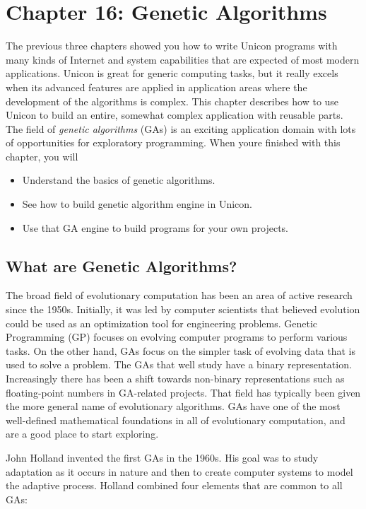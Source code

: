 \clearpage\section{Chapter 16: Genetic Algorithms}

The previous three chapters showed you how to write Unicon programs with
many kinds of Internet and system capabilities that are expected of
most modern applications. Unicon is great for generic computing tasks,
but it really excels when its advanced features are applied in
application areas where the development of the algorithms is complex.
This chapter describes how to use Unicon to build an entire, somewhat
complex application with reusable parts. The field of \textit{genetic algorithms} (GAs) is an exciting application
domain with lots of opportunities for exploratory programming. When
you{\textquotesingle}re finished with this chapter, you will 

\begin{itemize}
\item Understand the basics of genetic algorithms.
\item See how to build genetic algorithm engine in Unicon.
\item Use that GA engine to build programs for your own projects.
\end{itemize}

\subsection{What are Genetic Algorithms?}

The broad field of evolutionary computation has been an area of active
research since the 1950s. Initially, it was led by computer scientists
that believed evolution could be used as an optimization tool for
engineering problems. Genetic Programming (GP) focuses on evolving
computer programs to perform various tasks. On the other hand, GAs
focus on the simpler task of evolving data that is used to solve a
problem. The GAs that we{\textquotesingle}ll study have a binary
representation. Increasingly there has been a shift towards non-binary
representations such as floating-point numbers in GA-related projects.
That field has typically been given the more general name of
evolutionary algorithms. GAs have one of the most well-defined
mathematical foundations in all of evolutionary computation, and are a
good place to start exploring. 

John Holland invented the first GAs in the 1960s. His goal was to study
adaptation as it occurs in nature and then to create computer systems
to model the adaptive process. Holland combined four elements that are
common to all GAs:

